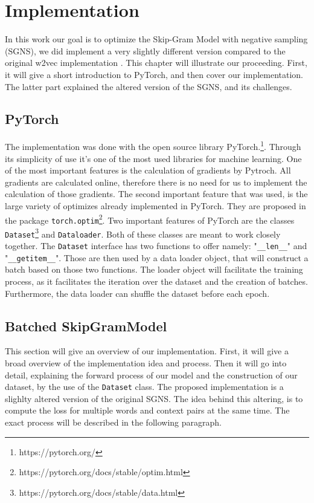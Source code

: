 \chapter{Implementation}\label{chap:implementation}

In this work our goal is to optimize the Skip-Gram Model with negative sampling (SGNS), we did implement a very slightly different version compared to the original w2vec implementation \cite{mikolov}.
This chapter will illustrate our proceeding. First, it will give a short introduction to PyTorch, and then cover our implementation. The latter part explained the altered version of the SGNS, and its challenges.
\section{PyTorch}
The implementation was done with the open source library PyTorch.\footnote{https://pytorch.org/}. Through its simplicity of use it's one of the most used libraries for machine learning. One of the most important features is the calculation of gradients by Pytroch. All gradients are calculated online, therefore there is no need for us to implement the calculation of those gradients. The second important feature that was used, is the large variety of optimizes already implemented in PyTorch. They are proposed in the package \texttt{torch.optim}\footnote{https://pytorch.org/docs/stable/optim.html}. Two important features of PyTorch are the classes \texttt{Dataset}\footnote{\label{note_data}https://pytorch.org/docs/stable/data.html} and \texttt{Dataloader}\footnotemark[\ref{note_data}]. Both of these classes are meant to work closely together. The \texttt{Dataset} interface has two functions to offer namely: "\texttt{\_\_len\_\_}" and "\texttt{\_\_getitem\_\_}". Those are then used by a data loader object, that will construct a batch based on those two functions. The loader object will facilitate the training process, as it facilitates the iteration over the dataset and the creation of batches. Furthermore, the data loader can shuffle the dataset before each epoch.

\section{Batched SkipGramModel} \label{ssec:b_SGM}
This section will give an overview of our implementation. First, it will give a broad overview of the implementation idea and process. Then it will go into detail, explaining the forward process of our model and the construction of our dataset, by the use of the \texttt{Dataset} class. The proposed implementation is a slighlty altered version of the original SGNS. The idea behind this altering, is to compute the loss for multiple words and context pairs at the same time. The exact process will be described in the following paragraph.
